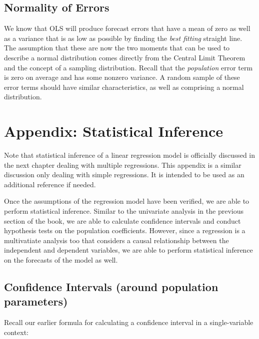 \documentclass[
]{book}
\begin{document}
\hypertarget{normality-of-errors}{%
\subsection{Normality of Errors}\label{normality-of-errors}}

We know that OLS will produce forecast errors that have a mean of zero as well as a variance that is as low as possible by finding the \emph{best fitting} straight line. The assumption that these are now the two moments that can be used to describe a normal distribution comes directly from the Central Limit Theorem and the concept of a sampling distribution. Recall that the \emph{population} error term is zero on average and has some nonzero variance. A random sample of these error terms should have similar characteristics, as well as comprising a normal distribution.

\hypertarget{appendix-statistical-inference}{%
\section{Appendix: Statistical Inference}\label{appendix-statistical-inference}}

Note that statistical inference of a linear regression model is officially discussed in the next chapter dealing with multiple regressions. This appendix is a similar discussion only dealing with simple regressions. It is intended to be used as an additional reference if needed.

Once the assumptions of the regression model have been verified, we are able to perform statistical inference. Similar to the univariate analysis in the previous section of the book, we are able to calculate confidence intervals and conduct hypothesis tests on the population coefficients. However, since a regression is a multivatiate analysis too that considers a causal relationship between the independent and dependent variables, we are able to perform statistical inference on the forecasts of the model as well.

\hypertarget{confidence-intervals-around-population-parameters}{%
\subsection{Confidence Intervals (around population parameters)}\label{confidence-intervals-around-population-parameters}}

Recall our earlier formula for calculating a confidence interval in a single-variable context:
\end{document}
